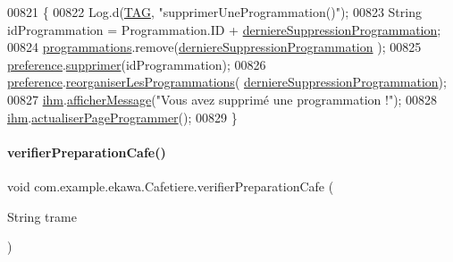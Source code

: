\begin{DoxyCode}
00821     \{
00822         Log.d(\hyperlink{classcom_1_1example_1_1ekawa_1_1_cafetiere_aa0c1fd99a2508b06c462aea17034aa91}{TAG}, \textcolor{stringliteral}{"supprimerUneProgrammation()"});
00823         String idProgrammation = Programmation.ID + 
      \hyperlink{classcom_1_1example_1_1ekawa_1_1_cafetiere_a79faede6506425563ec617affef48e09}{derniereSuppressionProgrammation};
00824         \hyperlink{classcom_1_1example_1_1ekawa_1_1_cafetiere_a987c8e1bcea506b65f4b05f955b3f699}{programmations}.remove(\hyperlink{classcom_1_1example_1_1ekawa_1_1_cafetiere_a79faede6506425563ec617affef48e09}{derniereSuppressionProgrammation}
      );
00825         \hyperlink{classcom_1_1example_1_1ekawa_1_1_cafetiere_aee3f9b78df63bc8dd73bf564954d51ca}{preference}.\hyperlink{classcom_1_1example_1_1ekawa_1_1_preference_a63914421a8e7b8f79822853e3aff3106}{supprimer}(idProgrammation);
00826         \hyperlink{classcom_1_1example_1_1ekawa_1_1_cafetiere_aee3f9b78df63bc8dd73bf564954d51ca}{preference}.\hyperlink{classcom_1_1example_1_1ekawa_1_1_preference_a98ab818534d930d51fa09de962780fe3}{reorganiserLesProgrammations}(
      \hyperlink{classcom_1_1example_1_1ekawa_1_1_cafetiere_a79faede6506425563ec617affef48e09}{derniereSuppressionProgrammation});
00827         \hyperlink{classcom_1_1example_1_1ekawa_1_1_cafetiere_a7db4a63088834eda5f6a3e951611bf82}{ihm}.\hyperlink{classcom_1_1example_1_1ekawa_1_1_ihm_ab1ca33ad18d42540299e3a58a82f4d9a}{afficherMessage}(\textcolor{stringliteral}{"Vous avez supprimé une programmation !"});
00828         \hyperlink{classcom_1_1example_1_1ekawa_1_1_cafetiere_a7db4a63088834eda5f6a3e951611bf82}{ihm}.\hyperlink{classcom_1_1example_1_1ekawa_1_1_ihm_adbeeac61b5a53c52d21da490659de983}{actualiserPageProgrammer}();
00829     \}
\end{DoxyCode}
\mbox{\label{classcom_1_1example_1_1ekawa_1_1_cafetiere_ac2f81a08528b9f7017bfe6183fde876f}} 
\paragraph{\texorpdfstring{verifier\+Preparation\+Cafe()}{verifierPreparationCafe()}}
{\footnotesize\ttfamily void com.\+example.\+ekawa.\+Cafetiere.\+verifier\+Preparation\+Cafe (\begin{DoxyParamCaption}\item[{String}]{trame }\end{DoxyParamCaption})\hspace{0.3cm}{\ttfamily [private]}}



